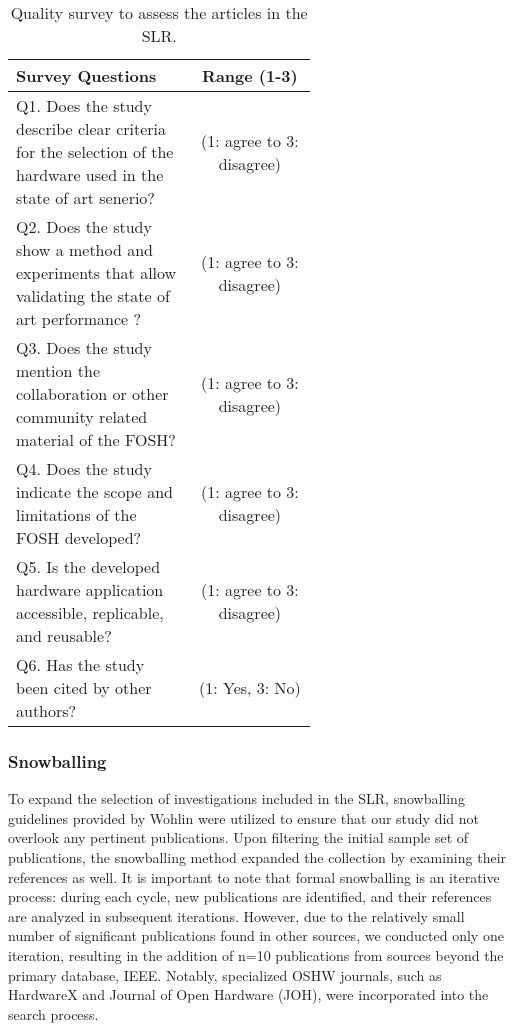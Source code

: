 \documentclass[final-report.tex]{subfiles}
\begin{document}
\begin{table}[htbp]
\centering
\caption{Quality survey to assess the articles in the SLR.}
\begin{tabular}{|p{0.6\linewidth}|c|}
\hline
\textbf{Survey Questions} & \textbf{Range (1-3)} \\
\hline
Q1. Does the study describe clear criteria for the selection of the hardware used in the state of art senerio? & (1: agree to 3: disagree) \\
\hline
Q2. Does the study show a method and experiments that allow validating the state of art performance ? & (1: agree to 3: disagree) \\
\hline
Q3. Does the study mention the collaboration or other community related material of the FOSH? & (1: agree to 3: disagree) \\
\hline
Q4. Does the study indicate the scope and limitations of the FOSH developed? & (1: agree to 3: disagree) \\
\hline
Q5. Is the developed hardware application accessible, replicable, and reusable? & (1: agree to 3: disagree) \\
\hline
Q6. Has the study been cited by other authors? & (1: Yes, 3: No) \\
\hline
\end{tabular}
\end{table}


\subsubsection{Snowballing}

To expand the selection of investigations included in the SLR, snowballing guidelines provided by Wohlin \cite{wohlin2014guidelines} were utilized to ensure that our study did not overlook any pertinent publications. 
Upon filtering the initial sample set of publications, the snowballing method expanded the collection by examining their references as well. 
It is important to note that formal snowballing is an iterative process: during each cycle, new publications are identified, and their references are analyzed in subsequent iterations. 
However, due to the relatively small number of significant publications found in other sources, we conducted only one iteration, resulting in the addition of n=10 publications from sources beyond the primary database, IEEE. 
Notably, specialized OSHW journals, such as HardwareX and Journal of Open Hardware (JOH), were incorporated into the search process.
\end{document}
